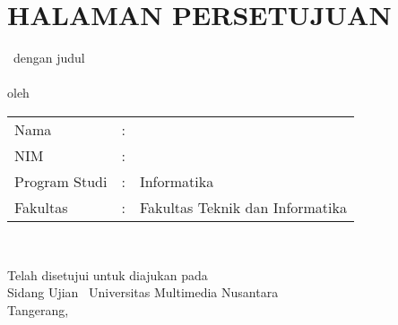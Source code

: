 \chapter*{HALAMAN PERSETUJUAN}
\onehalfspacing
\noindent 
\begin{center}
    \type \, dengan judul \\[1cm]
    
    \bo{\Judul}  \\[1cm]
    oleh \\[0.5cm]



\noindent
\begin{tabular}{l l p{6cm}}
	Nama&: & \penulis \\
	NIM&: & \nim \\
	Program Studi&: & Informatika \\
	Fakultas &: & Fakultas Teknik dan Informatika \\
\end{tabular} \\

\end{center}

\vspace{1cm}


\begin{center}
    Telah disetujui untuk diajukan pada \\[0.3cm]
    Sidang Ujian \type \, Universitas Multimedia Nusantara \\[0.3cm]
    Tangerang, \tanggalPengumpulan \\[0.3cm]
    
\end{center}
    

\vspace{1em}

